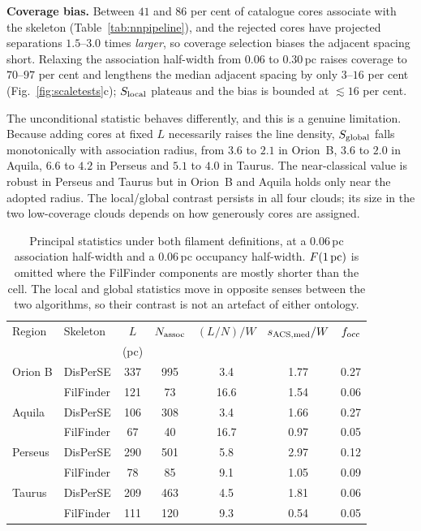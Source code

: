 \documentclass[usenatbib,twoside,twocolumn]{mnras}
\begin{document}
\smallskip\noindent\textbf{Coverage bias.} Between $41$ and $86$ per cent of catalogue cores associate with the skeleton (Table~\ref{tab:nnpipeline}), and the rejected cores have projected separations $1.5$--$3.0$ times \emph{larger}, so coverage selection biases the adjacent spacing short. Relaxing the association half-width from $0.06$ to $0.30$\,pc raises coverage to $70$--$97$ per cent and lengthens the median adjacent spacing by only $3$--$16$ per cent (Fig.~\ref{fig:scaletests}c); $S_{\rm local}$ plateaus and the bias is bounded at $\lesssim16$ per cent.

The unconditional statistic behaves differently, and this is a genuine limitation. Because adding cores at fixed $L$ necessarily raises the line density, $S_{\rm global}$ falls monotonically with association radius, from $3.6$ to $2.1$ in Orion~B, $3.6$ to $2.0$ in Aquila, $6.6$ to $4.2$ in Perseus and $5.1$ to $4.0$ in Taurus. The near-classical value is robust in Perseus and Taurus but in Orion~B and Aquila holds only near the adopted radius. The local/global contrast persists in all four clouds; its size in the two low-coverage clouds depends on how generously cores are assigned.

\begin{table}
\caption{Principal statistics under both filament definitions, at a $0.06$\,pc association half-width and a $0.06$\,pc occupancy half-width. $F(1\,{\rm pc})$ is omitted where the FilFinder components are mostly shorter than the cell. The local and global statistics move in opposite senses between the two algorithms, so their contrast is not an artefact of either ontology.}
\label{tab:ontology}
\footnotesize
\setlength{\tabcolsep}{3pt}
\begin{tabular}{llccccc}
\toprule
Region & Skeleton & $L$ & $N_{\rm assoc}$ & $(L/N)/W$ & $s_{\rm ACS,med}/W$ & $f_{\rm occ}$ \\
 & & (pc) & & & & \\
\midrule
Orion B & DisPerSE  & 337 & 995 & 3.4 & 1.77 & 0.27 \\
        & FilFinder & 121 &  73 & 16.6 & 1.54 & 0.06 \\
Aquila  & DisPerSE  & 106 & 308 & 3.4 & 1.66 & 0.27 \\
        & FilFinder &  67 &  40 & 16.7 & 0.97 & 0.05 \\
Perseus & DisPerSE  & 290 & 501 & 5.8 & 2.97 & 0.12 \\
        & FilFinder &  78 &  85 &  9.1 & 1.05 & 0.09 \\
Taurus  & DisPerSE  & 209 & 463 & 4.5 & 1.81 & 0.06 \\
        & FilFinder & 111 & 120 &  9.3 & 0.54 & 0.05 \\
\bottomrule
\end{tabular}
\end{table}
\end{document}

